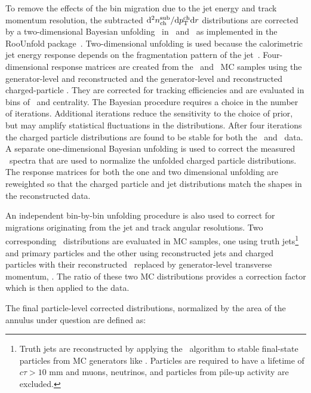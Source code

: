 
To remove the effects of the bin migration due to the jet energy and track momentum resolution, the subtracted $\mathrm{d}^2 \mbox{$n_{\mathrm{ch}}^{\mathrm{sub}}$} /\mathrm{d}\mbox{$p_{\mathrm{T}}^{\mathrm{ch}}$} \mathrm{d} r$ distributions are corrected by a two-dimensional Bayesian unfolding~\cite{DAgostini:1994zf}
in \pttrk\ and \ptjet\ as implemented in the RooUnfold package~\cite{Adye:2011gm}.  
Two-dimensional unfolding is used because the calorimetric jet energy response depends on the fragmentation pattern of the jet~\cite{Aad:2011he}.
Four-dimensional response matrices are created from the \pp\ and \pbpb\ MC samples using the generator-level and reconstructed \ptjet and the generator-level and reconstructed charged-particle \pttrk. They are corrected for tracking efficiencies and are evaluated in bins of \rvar\ and centrality. The Bayesian procedure requires a choice in the number of iterations.
Additional iterations reduce the sensitivity to the choice of prior, but may
amplify statistical fluctuations in the distributions.
After four iterations the 
charged particle distributions are found to be stable for both the \PbPb\ and \pp\ data.
A separate one-dimensional Bayesian unfolding is used to correct the measured \ptjet\ spectra that are used to normalize the unfolded charged particle distributions.
The response matrices for both the one and two dimensional unfolding are reweighted so that the charged particle and jet distributions match the shapes in the reconstructed data.

An independent bin-by-bin unfolding procedure is also used to correct for migrations originating from the jet and track angular resolutions. Two corresponding \Dptr\ distributions are evaluated in MC samples, one using truth jets\footnote{Truth jets are reconstructed by applying the \antikt\ algorithm to stable final-state particles from MC generators like \PYTHIA. Particles are required to have a lifetime of $c\tau > 10$ mm and muons, neutrinos, and particles from pile-up activity are excluded.} and primary particles and the other using reconstructed jets and charged particles with their reconstructed \pt\ replaced by generator-level transverse momentum, \pTtrue. The ratio of these two MC distributions provides a correction factor which is then applied to the data. 

The final particle-level corrected distributions, normalized by the area of the annulus under question are defined as:

